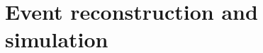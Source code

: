 \chapter{Event reconstruction and simulation}\label{chapter:reconstruction}
\begingroup
\graphicspath{{results/HESE_Final_Paper/}}

\endgroup